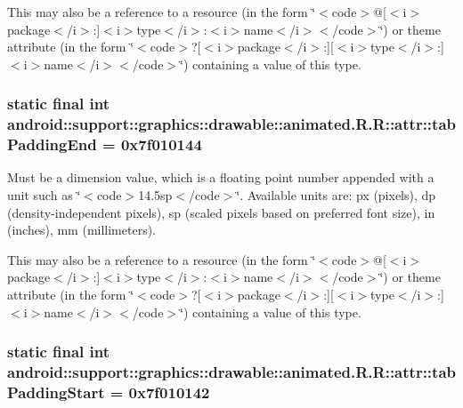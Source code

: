 This may also be a reference to a resource (in the form \char`\"{}$<$code$>$@\mbox{[}$<$i$>$package$<$/i$>$:\mbox{]}$<$i$>$type$<$/i$>$:$<$i$>$name$<$/i$>$$<$/code$>$\char`\"{}) or theme attribute (in the form \char`\"{}$<$code$>$?\mbox{[}$<$i$>$package$<$/i$>$:\mbox{]}\mbox{[}$<$i$>$type$<$/i$>$:\mbox{]}$<$i$>$name$<$/i$>$$<$/code$>$\char`\"{}) containing a value of this type. \hypertarget{classandroid_1_1support_1_1graphics_1_1drawable_1_1animated_1_1_r_1_1attr_a643bc888de4dbb7fc09d496b957c8cc}{
\subsubsection[{tabPaddingEnd}]{\setlength{\rightskip}{0pt plus 5cm}static final int android::support::graphics::drawable::animated.R.R::attr::tabPaddingEnd = 0x7f010144}}
\label{classandroid_1_1support_1_1graphics_1_1drawable_1_1animated_1_1_r_1_1attr_a643bc888de4dbb7fc09d496b957c8cc}


Must be a dimension value, which is a floating point number appended with a unit such as \char`\"{}$<$code$>$14.5sp$<$/code$>$\char`\"{}. Available units are: px (pixels), dp (density-independent pixels), sp (scaled pixels based on preferred font size), in (inches), mm (millimeters). 

This may also be a reference to a resource (in the form \char`\"{}$<$code$>$@\mbox{[}$<$i$>$package$<$/i$>$:\mbox{]}$<$i$>$type$<$/i$>$:$<$i$>$name$<$/i$>$$<$/code$>$\char`\"{}) or theme attribute (in the form \char`\"{}$<$code$>$?\mbox{[}$<$i$>$package$<$/i$>$:\mbox{]}\mbox{[}$<$i$>$type$<$/i$>$:\mbox{]}$<$i$>$name$<$/i$>$$<$/code$>$\char`\"{}) containing a value of this type. \hypertarget{classandroid_1_1support_1_1graphics_1_1drawable_1_1animated_1_1_r_1_1attr_34565d538adcdf2171fa7bcaef0f35f2}{
\subsubsection[{tabPaddingStart}]{\setlength{\rightskip}{0pt plus 5cm}static final int android::support::graphics::drawable::animated.R.R::attr::tabPaddingStart = 0x7f010142}}
\label{classandroid_1_1support_1_1graphics_1_1drawable_1_1animated_1_1_r_1_1attr_34565d538adcdf2171fa7bcaef0f35f2}


